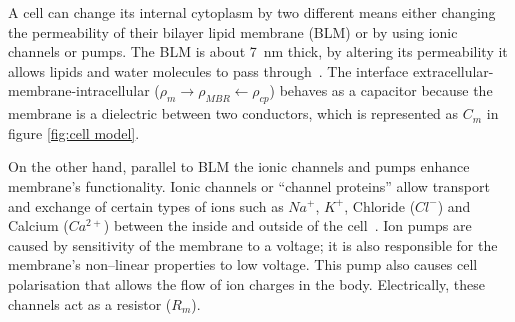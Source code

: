 A cell can change its internal cytoplasm by two different means either changing the permeability of their bilayer lipid membrane (BLM) or by using ionic channels or pumps. The BLM is about \SI{7}{\nano\meter} thick, by altering its permeability it allows lipids and water molecules to pass through~\cite{ivorra2003bioimpedance}. The interface extracellular-membrane-intracellular ($\rho_m \rightarrow \rho_{MBR} \leftarrow \rho_{cp}$) behaves as a capacitor because the membrane is a dielectric between two conductors, which is represented as $C_m$ in figure \ref{fig:cell model}.

On the other hand, parallel to BLM the ionic channels and pumps enhance membrane’s functionality. Ionic channels or “channel proteins” allow transport and exchange of certain types of ions such as $Na^{+}$, $K^{+}$, Chloride ($Cl^{-}$) and Calcium ($Ca^{2+}$) between the inside and outside of the cell~\cite{lvovich2012impedance}. Ion pumps are caused by sensitivity of the membrane to a voltage; it is also responsible for the membrane’s non–linear properties to low voltage. This pump also causes cell polarisation that allows the flow of ion charges in the body. Electrically, these channels act as a resistor ($R_m$).

